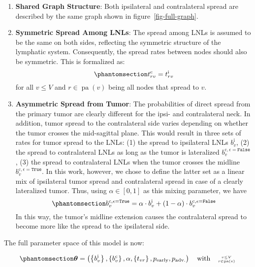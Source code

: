 \documentclass[
  sn-mathphys-num,
]{sn-jnl}
\providecommand{\tightlist}{%
  \setlength{\itemsep}{0pt}\setlength{\parskip}{0pt}}\usepackage{longtable,booktabs,array}
\begin{document}
\begin{enumerate}
\def\labelenumi{\arabic{enumi}.}
\tightlist
\item
  \textbf{Shared Graph Structure}: Both ipsilateral and contralateral
  spread are described by the same graph shown in
  figure~\ref{fig-full-graph}.
\item
  \textbf{Symmetric Spread Among LNLs}: The spread among LNLs is assumed
  to be the same on both sides, reflecting the symmetric structure of
  the lymphatic system. Consequently, the spread rates between nodes
  should also be symmetric. This is formalized as:\\
  \begin{equation}\phantomsection\label{eq-symmetries}{
    t_{rv}^\text{c} = t_{rv}^\text{i}
    }\end{equation} for all \(v \leq V\) and
  \(r \in \operatorname{pa}(v)\) being all nodes that spread to \(v\).
\item
  \textbf{Asymmetric Spread from Tumor}: The probabilities of direct
  spread from the primary tumor are clearly different for the ipsi- and
  contralateral neck. In addition, tumor spread to the contralateral
  side varies depending on whether the tumor crosses the mid-sagittal
  plane. This would result in three sets of rates for tumor spread to
  the LNLs: (1) the spread to ipsilateral LNLs \(b^\text{i}_v\), (2) the
  spread to contralateral LNLs as long as the tumor is lateralized
  \(b_v^{\text{c},\epsilon=\texttt{False}}\), (3) the spread to
  contralateral LNLs when the tumor crosses the midline
  \(b_v^{\text{c},\epsilon=\texttt{True}}\). In this work, however, we
  chose to define the latter set as a linear mix of ipsilateral tumor
  spread and contralateral spread in case of a clearly lateralized
  tumor. Thus, using \(\alpha \in [0,1]\) as this mixing parameter, we
  have \begin{equation}\phantomsection\label{eq-mixing}{
    b_v^{\text{c},\epsilon=\texttt{True}} = \alpha \cdot b_v^\text{i} + (1 - \alpha) \cdot b_v^{\text{c},\epsilon=\texttt{False}}
    }\end{equation} In this way, the tumor's midline extension causes
  the contralateral spread to become more like the spread to the
  ipsilateral side.
\end{enumerate}

The full parameter space of this model is now:

\begin{equation}\phantomsection\label{eq-bi-param-space}{
\boldsymbol{\theta} = \left( \left\{ b_v^\text{i} \right\}, \left\{ b_v^\text{c} \right\}, \alpha, \left\{ t_{vr} \right\}, p_\text{early}, p_\text{adv.} \right) \quad \text{with} \quad \genfrac{}{}{0pt}{2}{v\leq V}{r\in\operatorname{pa}(v)}
}\end{equation}
\end{document}
